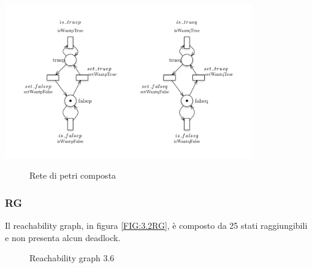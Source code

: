 \documentclass[a4paper]{article}
\begin{document}
\begin{center}
{}
\includegraphics[width=0.8\textwidth]{variables.png}
\end{center}
\newpage
\begin{figure}[!ht]
\centering
{}
\caption{Rete di petri composta} \label{FIG:3.6PN}
\end{figure}
\newpage
\subsubsection{RG}
Il reachability graph, in figura \ref{FIG:3.2RG}, è composto da 25 stati raggiungibili e non presenta alcun deadlock.
\begin{figure}[!ht]
\centering
{}
\caption{Reachability graph 3.6} \label{FIG:3.6RG}
\end{figure}
\newpage
\end{document}
